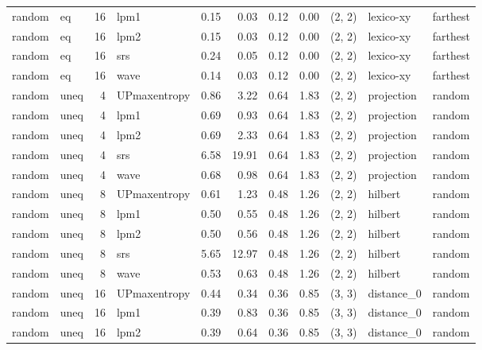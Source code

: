 \begin{tabular}{llrlrrrrlll}
random &    eq & 16 &         lpm1 &  0.15 &     0.03 &   0.12 &       0.00 & (2, 2) &   lexico-xy &   farthest \\
random &    eq & 16 &         lpm2 &  0.15 &     0.03 &   0.12 &       0.00 & (2, 2) &   lexico-xy &   farthest \\
random &    eq & 16 &          srs &  0.24 &     0.05 &   0.12 &       0.00 & (2, 2) &   lexico-xy &   farthest \\
random &    eq & 16 &         wave &  0.14 &     0.03 &   0.12 &       0.00 & (2, 2) &   lexico-xy &   farthest \\
random &  uneq &  4 & UPmaxentropy &  0.86 &     3.22 &   0.64 &       1.83 & (2, 2) &  projection &     random \\
random &  uneq &  4 &         lpm1 &  0.69 &     0.93 &   0.64 &       1.83 & (2, 2) &  projection &     random \\
random &  uneq &  4 &         lpm2 &  0.69 &     2.33 &   0.64 &       1.83 & (2, 2) &  projection &     random \\
random &  uneq &  4 &          srs &  6.58 &    19.91 &   0.64 &       1.83 & (2, 2) &  projection &     random \\
random &  uneq &  4 &         wave &  0.68 &     0.98 &   0.64 &       1.83 & (2, 2) &  projection &     random \\
random &  uneq &  8 & UPmaxentropy &  0.61 &     1.23 &   0.48 &       1.26 & (2, 2) &     hilbert &     random \\
random &  uneq &  8 &         lpm1 &  0.50 &     0.55 &   0.48 &       1.26 & (2, 2) &     hilbert &     random \\
random &  uneq &  8 &         lpm2 &  0.50 &     0.56 &   0.48 &       1.26 & (2, 2) &     hilbert &     random \\
random &  uneq &  8 &          srs &  5.65 &    12.97 &   0.48 &       1.26 & (2, 2) &     hilbert &     random \\
random &  uneq &  8 &         wave &  0.53 &     0.63 &   0.48 &       1.26 & (2, 2) &     hilbert &     random \\
random &  uneq & 16 & UPmaxentropy &  0.44 &     0.34 &   0.36 &       0.85 & (3, 3) &  distance_0 &     random \\
random &  uneq & 16 &         lpm1 &  0.39 &     0.83 &   0.36 &       0.85 & (3, 3) &  distance_0 &     random \\
random &  uneq & 16 &         lpm2 &  0.39 &     0.64 &   0.36 &       0.85 & (3, 3) &  distance_0 &     random \\

\end{tabular}

